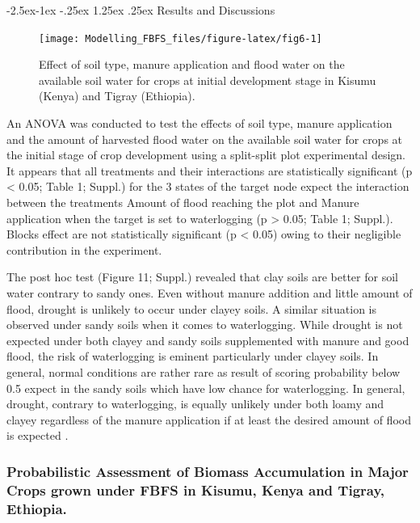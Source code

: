 \documentclass[12pt,oneside]{article}
\makeatletter
\renewcommand\paragraph{\@startsection{paragraph}{4}{\z@}%
            {-2.5ex\@plus -1ex \@minus -.25ex}%
            {1.25ex \@plus .25ex}%
            {\normalfont\normalsize\bfseries}}
\makeatother
\begin{document}
\hypertarget{IV213}{%
\paragraph{Results and Discussions}\label{IV213}}

\begin{figure}[!htbp]

{\centering \texttt{[image: Modelling\_FBFS\_files/figure-latex/fig6-1]} 

}

\caption{Effect of soil type, manure application and flood water on the available soil water for crops at initial development stage in Kisumu (Kenya) and Tigray (Ethiopia).}\label{fig:fig6}
\end{figure}

An ANOVA was conducted to test the effects of soil type, manure application and the amount of harvested flood water on the available soil water for crops at the initial stage of crop development using a split-split plot experimental design. It appears that all treatments and their interactions are statistically significant (p \textless{} 0.05; Table 1; Suppl.) for the 3 states of the target node expect the interaction between the treatments Amount of flood reaching the plot and Manure application when the target is set to waterlogging (p \textgreater{} 0.05; Table 1; Suppl.). Blocks effect are not statistically significant (p \textless{} 0.05) owing to their negligible contribution in the experiment.

The post hoc test (Figure 11; Suppl.) revealed that clay soils are better for soil water contrary to sandy ones. Even without manure addition and little amount of flood, drought is unlikely to occur under clayey soils. A similar situation is observed under sandy soils when it comes to waterlogging. While drought is not expected under both clayey and sandy soils supplemented with manure and good flood, the risk of waterlogging is eminent particularly under clayey soils. In general, normal conditions are rather rare as result of scoring probability below 0.5 expect in the sandy soils which have low chance for waterlogging. In general, drought, contrary to waterlogging, is equally unlikely under both loamy and clayey regardless of the manure application if at least the desired amount of flood is expected .

\hypertarget{IV22}{%
\subsubsection{Probabilistic Assessment of Biomass Accumulation in Major Crops grown under FBFS in Kisumu, Kenya and Tigray, Ethiopia.}\label{IV22}}
\end{document}
